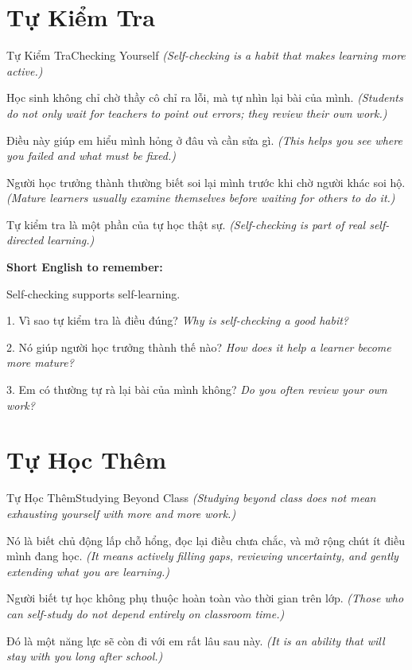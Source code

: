 \section{Tự Kiểm Tra}
\begin{truyen}{Tự Kiểm Tra}{Checking Yourself}
\textit{(Self-checking is a habit that makes learning more active.)}

Học sinh không chỉ chờ thầy cô chỉ ra lỗi, mà tự nhìn lại bài của mình.
\textit{(Students do not only wait for teachers to point out errors; they review their own work.)}

Điều này giúp em hiểu mình hỏng ở đâu và cần sửa gì.
\textit{(This helps you see where you failed and what must be fixed.)}

Người học trưởng thành thường biết soi lại mình trước khi chờ người khác soi hộ.
\textit{(Mature learners usually examine themselves before waiting for others to do it.)}
\end{truyen}

\begin{baihoc}
Tự kiểm tra là một phần của tự học thật sự.
\textit{(Self-checking is part of real self-directed learning.)}
\end{baihoc}

\begin{ghinhoanh}
\textbf{Short English to remember:}

Self-checking supports self-learning.

\end{ghinhoanh}

\begin{tuhocnhanh}
1. Vì sao tự kiểm tra là điều đúng? \textit{Why is self-checking a good habit?}

2. Nó giúp người học trưởng thành thế nào? \textit{How does it help a learner become more mature?}

3. Em có thường tự rà lại bài của mình không? \textit{Do you often review your own work?}
\end{tuhocnhanh}
\ngancach

\section{Tự Học Thêm}
\begin{truyen}{Tự Học Thêm}{Studying Beyond Class}
\textit{(Studying beyond class does not mean exhausting yourself with more and more work.)}

Nó là biết chủ động lấp chỗ hổng, đọc lại điều chưa chắc, và mở rộng chút ít điều mình đang học.
\textit{(It means actively filling gaps, reviewing uncertainty, and gently extending what you are learning.)}

Người biết tự học không phụ thuộc hoàn toàn vào thời gian trên lớp.
\textit{(Those who can self-study do not depend entirely on classroom time.)}

Đó là một năng lực sẽ còn đi với em rất lâu sau này.
\textit{(It is an ability that will stay with you long after school.)}
\end{truyen}

